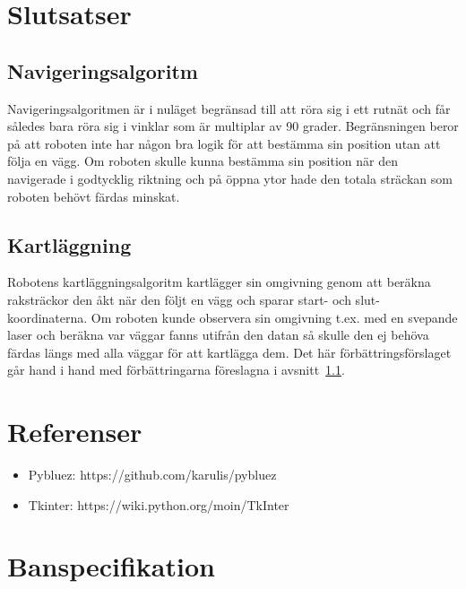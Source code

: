 \documentclass{article}
\begin{document}
\clearpage
\section{Slutsatser}

\subsection{Navigeringsalgoritm}
\label{sec:slutsatser_navigering}
Navigeringsalgoritmen är i nuläget begränsad till att röra sig i ett rutnät och får således bara röra sig i vinklar som är multiplar av 90 grader. Begränsningen beror på att roboten inte har någon bra logik för att bestämma sin position utan att följa en vägg. Om roboten skulle kunna bestämma sin position när den navigerade i godtycklig riktning och på öppna ytor hade den totala sträckan som roboten behövt färdas minskat.

\subsection{Kartläggning}
Robotens kartläggningsalgoritm kartlägger sin omgivning genom att beräkna raksträckor den åkt när den följt en vägg och sparar start- och slut-koordinaterna. Om roboten kunde observera sin omgivning t.ex. med en svepande laser och beräkna var väggar fanns utifrån den datan så skulle den ej behöva färdas längs med alla väggar för att kartlägga dem. Det här förbättringsförslaget går hand i hand med förbättringarna föreslagna i avsnitt~\ref{sec:slutsatser_navigering}.

\clearpage
\section{Referenser}
\begin{itemize}
    \item Pybluez: https://github.com/karulis/pybluez
    \item Tkinter: https://wiki.python.org/moin/TkInter
\end{itemize}

\appendix
\clearpage
\section{Banspecifikation}
\label{sec:banspec}

\end{document}
